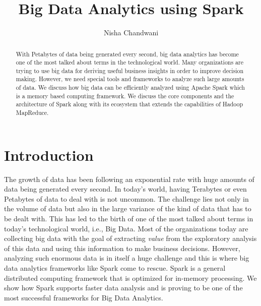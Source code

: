 \documentclass[sigconf]{acmart}
\begin{document}
\title{Big Data Analytics using Spark}


\author{Nisha Chandwani}


\renewcommand{\shortauthors}{B. Trovato et al.}


\begin{abstract}
With Petabytes of data being generated every second, big data analytics has become one of the most talked about terms in the technological world. Many organizations are trying to use big data for deriving useful business insights in order to improve decision making. However, we need special tools and frameworks to analyze such large amounts of data. We discuss how big data can be efficiently analyzed using Apache Spark which is a memory based computing framework. We discuss the core components and the architecture of Spark along with its ecosystem that extends the capabilities of Hadoop MapReduce. 

\end{abstract}


\maketitle

\section{Introduction}

The growth of data has been following an exponential rate with huge amounts of data being generated every second. In today's world, having Terabytes or even Petabytes of data to deal with is not uncommon. The challenge lies not only in the volume of data but also in the large variance of the kind of data that has to be dealt with. This has led to the birth of one of the most talked about terms in today's technological world, i.e., Big Data. Most of the organizations today are collecting big data with the goal of extracting \emph{value} from the exploratory analysis of this data and using this information to make business decisions. However, analyzing such enormous data is in itself a huge challenge and this is where big data analytics frameworks like Spark come to rescue. Spark is a general distributed computing framework that is optimized for in-memory processing. We show how Spark supports faster data analysis and is proving to be one of the most successful frameworks for Big Data Analytics.
\end{document}

